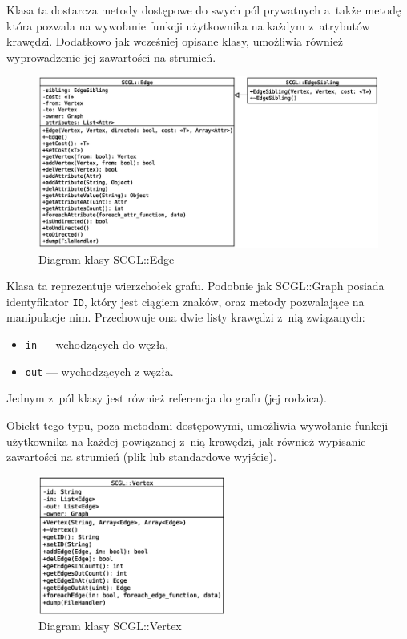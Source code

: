 \documentclass[a4paper,12pt,polish,oneside,openright]{thesis}
\newcommand\code[1]{\lstinline[style=line]{#1}}
\begin{document}
\begin{description}
	Klasa ta dostarcza metody dostępowe do swych pól prywatnych a~także metodę która pozwala na wywołanie funkcji użytkownika na każdym z~atrybutów krawędzi.
	Dodatkowo jak wcześniej opisane klasy, umożliwia również wyprowadzenie jej zawartości na strumień.
	\begin{figure}[htb]
	\begin{center}
		\includegraphics[width=1.00\textwidth]{gfx/class_edge.eps}
		\caption{Diagram klasy SCGL::Edge}
	\end{center}
	\end{figure}

	\item[SCGL::Vertex]
	Klasa ta reprezentuje wierzchołek grafu.
	Podobnie jak SCGL::Graph posiada identyfikator \code{ID}, który jest ciągiem znaków, oraz metody pozwalające na manipulacje nim.
	Przechowuje ona dwie listy krawędzi z~nią związanych:
	\begin{itemize}
		\item \code{in} --- wchodzących do węzła,
		\item \code{out} --- wychodzących z węzła.
	\end{itemize}
	Jednym z~pól klasy jest również referencja do grafu (jej rodzica).

	Obiekt tego typu, poza metodami dostępowymi, umożliwia wywołanie funkcji użytkownika na każdej powiązanej z~nią krawędzi, jak również wypisanie zawartości na strumień (plik lub standardowe wyjście).
	\begin{figure}[htb]
	\begin{center}
		\includegraphics[width=0.55\textwidth]{gfx/class_vertex.eps}
		\caption{Diagram klasy SCGL::Vertex}
	\end{center}
	\end{figure}


\end{description}
\end{document}
